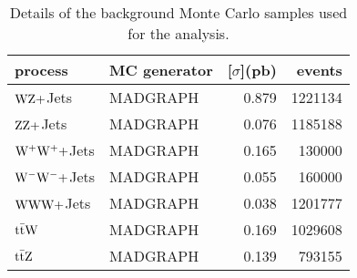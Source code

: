 \begin{table}[phtb]
    \centering
\begin{tabular}{llrr}
    \toprule
process & MC generator & \unit[$\sigma$]{(pb)} & events \\
\midrule
$\mathrm{W}\mathrm{Z}+$Jets                                          & MADGRAPH & 0.879 & 1221134  \\
$\mathrm{Z}\mathrm{Z}+$Jets                                          & MADGRAPH & 0.076 & 1185188  \\
$\mathrm{W}^{+}\mathrm{W}^{+}+$Jets                                  & MADGRAPH & 0.165        & 130000    \\
$\mathrm{W}^{-}\mathrm{W}^{-}+$Jets                                  & MADGRAPH & 0.055        & 160000    \\
$\mathrm{W}\mathrm{W}\mathrm{W}+$Jets                                       & MADGRAPH & 0.038        & 1201777  \\
$\mathrm{t}\bar{\mathrm{t}} \mathrm{W}$                                         & MADGRAPH & 0.169 & 1029608  \\
$\mathrm{t}\bar{\mathrm{t}} \mathrm{Z}$                                         & MADGRAPH & 0.139        & 793155    \\
\bottomrule
\end{tabular}
\caption{Details of the background Monte Carlo samples used for the analysis.}
\label{tab:background_mc}
\end{table}
